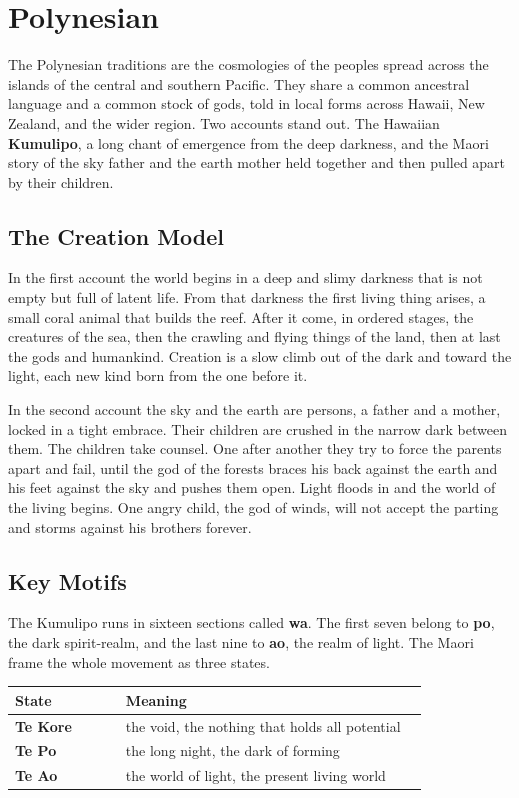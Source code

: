 \section{Polynesian}

The Polynesian traditions are the cosmologies of the peoples spread across the islands of the central and southern Pacific. They share a common ancestral language and a common stock of gods, told in local forms across Hawaii, New Zealand, and the wider region. Two accounts stand out. The Hawaiian \textbf{Kumulipo}, a long chant of emergence from the deep darkness, and the Maori story of the sky father and the earth mother held together and then pulled apart by their children.

\subsection{The Creation Model}

In the first account the world begins in a deep and slimy darkness that is not empty but full of latent life. From that darkness the first living thing arises, a small coral animal that builds the reef. After it come, in ordered stages, the creatures of the sea, then the crawling and flying things of the land, then at last the gods and humankind. Creation is a slow climb out of the dark and toward the light, each new kind born from the one before it.

In the second account the sky and the earth are persons, a father and a mother, locked in a tight embrace. Their children are crushed in the narrow dark between them. The children take counsel. One after another they try to force the parents apart and fail, until the god of the forests braces his back against the earth and his feet against the sky and pushes them open. Light floods in and the world of the living begins. One angry child, the god of winds, will not accept the parting and storms against his brothers forever.

\subsection{Key Motifs}

The Kumulipo runs in sixteen sections called \textbf{wa}. The first seven belong to \textbf{po}, the dark spirit-realm, and the last nine to \textbf{ao}, the realm of light. The Maori frame the whole movement as three states.

\begin{longtable}{L{0.22\linewidth}
L{0.6\linewidth}}
\toprule
\textbf{State} & \textbf{Meaning} \\
\midrule
\textbf{Te Kore} & the void, the nothing that holds all potential \\
\textbf{Te Po} & the long night, the dark of forming \\
\textbf{Te Ao} & the world of light, the present living world \\
\bottomrule
\end{longtable}


